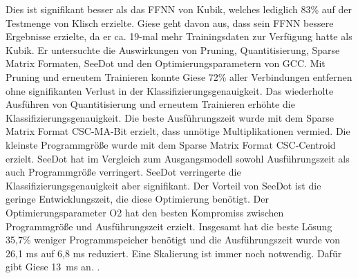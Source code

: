 Dies ist signifikant besser als das FFNN von Kubik, welches lediglich 83\% auf der Testmenge von Klisch erzielte.
Giese geht davon aus, dass sein FFNN bessere Ergebnisse erzielte, da er ca. 19-mal mehr Trainingsdaten zur Verfügung hatte als Kubik. Er untersuchte die Auswirkungen von Pruning, Quantitisierung, Sparse Matrix Formaten, SeeDot und
den Optimierungsparametern von GCC. Mit Pruning und erneutem Trainieren konnte Giese 72\% aller Verbindungen entfernen ohne signifikanten Verlust in der Klassifizierungsgenauigkeit. Das wiederholte Ausführen von Quantitisierung und
erneutem Trainieren erhöhte die Klassifizierungsgenauigkeit. Die beste Ausführungszeit wurde mit dem Sparse Matrix Format CSC-MA-Bit erzielt, dass unnötige Multiplikationen vermied. Die kleinste Programmgröße wurde mit dem
Sparse Matrix Format CSC-Centroid erzielt.
\newline
\newline
SeeDot hat im Vergleich zum Ausgangsmodell sowohl Ausführungszeit als auch Programmgröße verringert. SeeDot verringerte die Klassifizierungsgenauigkeit aber signifikant. Der Vorteil von SeeDot
ist die geringe Entwicklungszeit, die diese Optimierung benötigt. Der Optimierungsparameter O2 hat den besten Kompromiss zwischen Programmgröße und Ausführungszeit erzielt. Insgesamt hat die beste Lösung 35,7\% weniger Programmspeicher
benötigt und die Ausführungszeit wurde von 26,1 ms auf 6,8 ms reduziert. Eine Skalierung ist immer noch notwendig. Dafür gibt Giese 13~ms an. \cite{gieseThesis}.